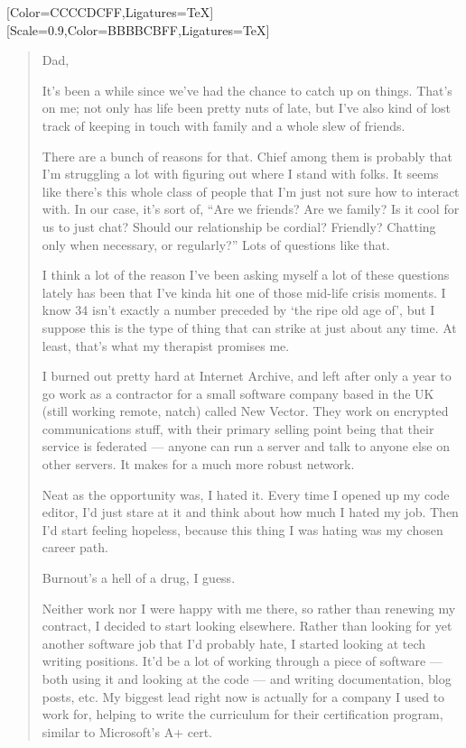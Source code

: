 \label{dad:as-a-person}
\renewcommand*{\footnoterule}{%
  \kern-3pt%
  \color[HTML]{ccccdc}\hrule width 0.4\columnwidth
  \kern2.6pt}
[Color=CCCCDCFF,Ligatures=TeX]
\renewfontfamily{}[Scale=0.9,Color=BBBBCBFF,Ligatures=TeX]
\begin{quotation}
  Dad,

  It's been a while since we've had the chance to catch up on things. That's on me; not only has life been pretty nuts of late, but I've also kind of lost track of keeping in touch with family and a whole slew of friends.

  There are a bunch of reasons for that. Chief among them is probably that I'm struggling a lot with figuring out where I stand with folks. It seems like there's this whole class of people that I'm just not sure how to interact with. In our case, it's sort of, ``Are we friends? Are we family? Is it cool for us to just chat? Should our relationship be cordial? Friendly? Chatting only when necessary, or regularly?'' Lots of questions like that.

  I think a lot of the reason I've been asking myself a lot of these questions lately has been that I've kinda hit one of those mid-life crisis moments. I know 34 isn't exactly a number preceded by `the ripe old age of', but I suppose this is the type of thing that can strike at just about any time. At least, that's what my therapist promises me.

  I burned out pretty hard at Internet Archive, and left after only a year to go work as a contractor for a small software company based in the UK (still working remote, natch) called New Vector. They work on encrypted communications stuff, with their primary selling point being that their service is federated --- anyone can run a server and talk to anyone else on other servers. It makes for a much more robust network.

  Neat as the opportunity was, I hated it. Every time I opened up my code editor, I'd just stare at it and think about how much I hated my job. Then I'd start feeling hopeless, because this thing I was hating was my chosen career path.

  Burnout's a hell of a drug, I guess.

  Neither work nor I were happy with me there, so rather than renewing my contract, I decided to start looking elsewhere. Rather than looking for yet another software job that I'd probably hate, I started looking at tech writing positions. It'd be a lot of working through a piece of software --- both using it and looking at the code --- and writing documentation, blog posts, etc. My biggest lead right now is actually for a company I used to work for, helping to write the curriculum for their certification program, similar to Microsoft's A+ cert.


\end{quotation}
